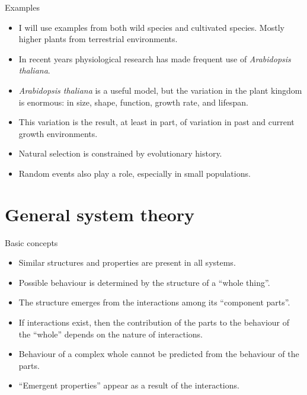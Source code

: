 \documentclass[10pt]{beamer}
\begin{document}
\begin{frame}{Examples}

\begin{itemize}
  \item I will use examples from both wild species and cultivated species. Mostly higher plants from terrestrial environments.
  \item In recent years physiological research has made frequent use of \emph{Arabidopsis thaliana}.
  \item \emph{Arabidopsis thaliana} is a useful model, but the variation in the plant kingdom is enormous: in size, shape, function, growth rate, and lifespan.
  \item This variation is the result, at least in part, of variation in past and current growth environments.
  \item Natural selection is constrained by evolutionary history.
  \item Random events also play a role, especially in small populations.
\end{itemize}

\end{frame}\section{General system theory}
\nocite{Meadows2008,Jones2015}

\begin{frame}{Basic concepts}
  \begin{itemize}
    \item Similar structures and properties are present in all systems.
    \item Possible behaviour is determined by the structure of a ``whole thing''.
    \item The structure emerges from the interactions among its ``component parts''.
    \item If interactions exist, then the contribution of the parts to the behaviour of the ``whole'' depends on the nature of interactions.
    \item Behaviour of a complex whole cannot be predicted from the behaviour of the parts.
    \item ``Emergent properties'' appear as a result of the interactions.
  \end{itemize}
\end{frame}
\end{document}
